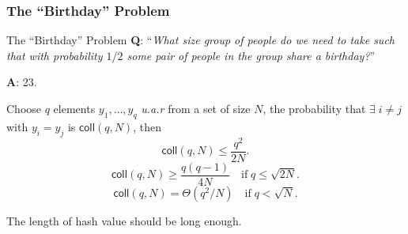 \begin{frame}\frametitle{The ``Birthday'' Problem}
\begin{exampleblock}{The ``Birthday'' Problem}
\textbf{Q}: ``\emph{What size group of people do we need to take such that with probability $1/2$ some pair of people in the group share a birthday?}''

\textbf{A}: 23.
\end{exampleblock}
\begin{lemma}
Choose $q$ elements $y_1,\dotsc , y_q$ \emph{u.a.r} from a set of size $N$, the probability that $\exists \; i \ne j$ with $y_i = y_j$ is $\mathsf{coll}(q,N)$, then 
\[ \mathsf{coll}(q,N) \le \frac{q^2}{2N}.
\]
\[ \mathsf{coll}(q,N) \ge  \frac{q(q-1)}{4N}\quad \text{if}\; q \le \sqrt{2N}.
\]
\[ \mathsf{coll}(q,N) = \Theta(q^2/N)\quad \text{if}\; q < \sqrt{N}.
\]
\end{lemma}
The length of hash value should be long enough.
\end{frame}
